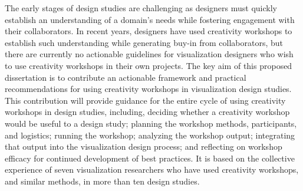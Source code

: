 

The early stages of design studies are challenging as designers must quickly establish an understanding of a domain's needs while fostering engagement with their collaborators. In recent years, designers have used creativity workshops to establish such understanding while generating buy-in from collaborators, but there are currently no actionable guidelines for visualization designers who wish to use creativity workshops in their own projects. The key aim of this proposed dissertation is to contribute an actionable framework and practical recommendations for using creativity workshops in visualization design studies. This contribution will provide guidance for the entire cycle of using creativity workshops in design studies, including, deciding whether a creativity workshop would be useful to a design study; planning the workshop methods, participants, and logistics; running the workshop; analyzing the workshop output; integrating that output into the visualization design process; and reflecting on workshop efficacy for continued development of best practices. It is based on the collective experience of seven visualization researchers who have used creativity workshops, and similar methods, in more than ten design studies.  